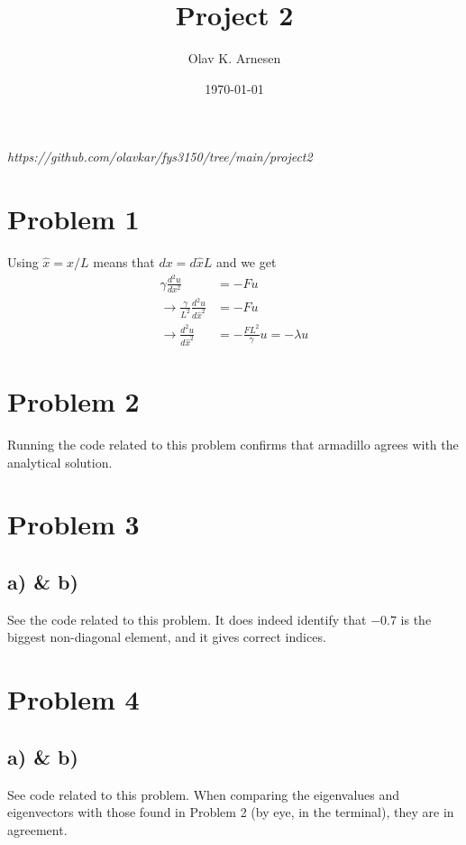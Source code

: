 \documentclass[english,notitlepage]{revtex4-2}  %
\begin{document}
\title{Project 2}      %
\author{Olav K. Arnesen}          %
\date{\today}                             %
\noaffiliation                            %

\maketitle 

\textit{https://github.com/olavkar/fys3150/tree/main/project2}

\section*{Problem 1}
Using $\hat{x}=x/L$ means that $dx=d\hat{x}L$ and we get 
\begin{equation}
	\begin{split}
		\gamma\frac{d^2u}{dx^2}&=-Fu \\
		\rightarrow \frac{\gamma}{L^2}\frac{d^2u}{d\hat{x}^2}&=-Fu \\
		\rightarrow \frac{d^2u}{d\hat{x}^2}&= -\frac{FL^2}{\gamma}u = -\lambda u
	\end{split}
\end{equation}

\section*{Problem 2}
Running the code related to this problem confirms that armadillo agrees with the analytical solution.

\section*{Problem 3}
\subsection*{a) \& b)}
See the code related to this problem. It does indeed identify that $-0.7$ is the biggest non-diagonal element, and it gives correct indices.
	
\section*{Problem 4}
\subsection*{a) \& b)}
See code related to this problem. When comparing the eigenvalues and eigenvectors with those found in Problem 2 (by eye, in the terminal), they are in agreement.
\end{document}
